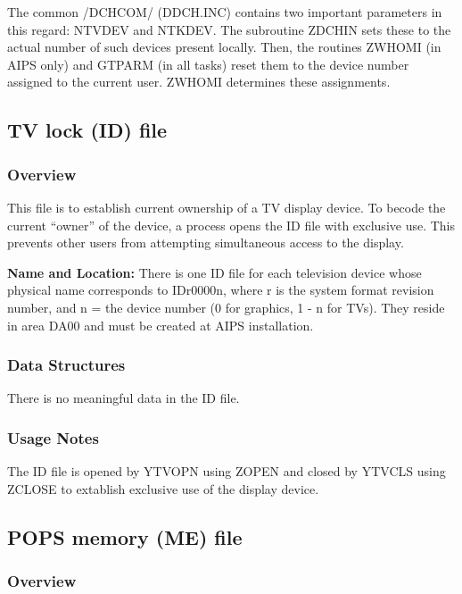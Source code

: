      The common /DCHCOM/ (DDCH.INC) contains two important parameters
in this regard: NTVDEV and NTKDEV.  The subroutine ZDCHIN sets these
to the actual number of such devices present locally.  Then, the
routines ZWHOMI (in AIPS only) and GTPARM (in all tasks) reset them to
the device number assigned to the current user.  ZWHOMI determines
these assignments.


\subsection{TV lock (ID) file}
\subsubsection{ Overview}

  This file is to establish current ownership of a TV display device.
To becode the current ``owner'' of the device, a process opens the ID
file with exclusive use.  This prevents other users from attempting
simultaneous access to the display.

{\bf Name and Location:}  There is one ID file for each
television device whose physical name corresponds to IDr0000n,
where r is the system format revision number, and n = the device number (0 for
graphics, 1 - n for TVs).  They reside in area DA00 and must be created
at AIPS installation.

\subsubsection{ Data Structures}

   There is no meaningful data in the ID file.
\subsubsection{Usage Notes}

   The ID file is opened by YTVOPN using ZOPEN and closed by YTVCLS
using ZCLOSE to extablish exclusive use of the display device.


\subsection{POPS memory (ME) file}
\subsubsection{Overview}

